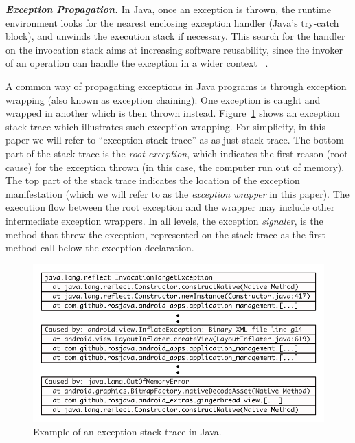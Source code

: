\documentclass[conference]{IEEEtran}
\begin{document}

\emph{\textbf{Exception Propagation.}} In Java, once an exception is thrown, 
the runtime environment looks for the nearest enclosing exception handler
(Java's try-catch block), and unwinds the execution stack if necessary.
This search for the handler on the invocation stack aims at increasing software reusability, 
since the invoker of an operation can handle the exception in a wider context ~\cite{miller1997issues}.

 A common way of  propagating exceptions in Java programs is through exception wrapping
 (also known as exception chaining): One exception 
is caught and wrapped in another which is then thrown instead. Figure~\ref{fig:wrapping} shows 
an exception stack trace which illustrates such exception wrapping. 
For simplicity, in this paper we will refer to ``exception stack trace'' as as just stack trace.
The bottom part of the stack trace is the \emph{root exception}, which indicates
the first reason (root cause) for the exception thrown (in this case, the computer run out of
memory). The top part of the stack trace indicates the location of the exception
manifestation (which we will refer to as the \emph{exception wrapper} in this paper). The
execution flow  between the root exception and the wrapper may
include other intermediate exception wrappers. In all levels, the exception
\emph{signaler}, is the method that threw the exception, represented on the
stack trace as the first method call below the exception declaration.

\begin{figure} \centering \includegraphics[scale=0.5]{stacktrace_bw.png}
\caption{Example of an exception stack trace in Java.}
\label{fig:wrapping}
\end{figure}
\end{document}
